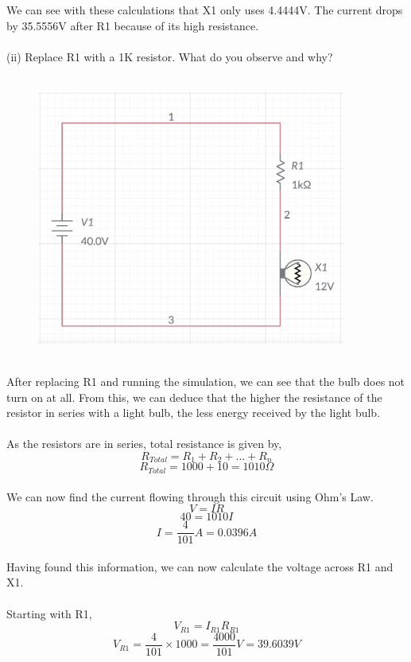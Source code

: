 \documentclass[12pt]{article}
\begin{document}
We can see with these calculations that X1 only uses 4.4444V. The current drops by 35.5556V after R1 because of its high resistance.\\
\\
(ii) Replace R1 with a 1K resistor. What do you observe and why?\\
\\
\begin{figure}[!h] 
	\begin{centering}
		\includegraphics[keepaspectratio = true, width = 4in]{Q2(ii).png}
	\end{centering}
\end{figure}\\
After replacing R1 and running the simulation, we can see that the bulb does not turn on at all. From this, we can deduce that the higher the resistance of the resistor in series with a light bulb, the less energy received by the light bulb.\\
\\
As the resistors are in series, total resistance is given by,\\
\[R_{Total} = R_1 + R_2 + ... + R_n\]
\[R_{Total} = 1000 + 10 = 1010\Omega\]\\
We can now find the current flowing through this circuit using Ohm's Law.\\
\[V = IR\]
\[40 = 1010I\]
\[I = \frac{4}{101}A = 0.0396A\]\\
Having found this information, we can now calculate the voltage across R1 and X1.\\
\\
Starting with R1,\\
\[V_{R1} = I_{R1}R_{R1}\]
\[V_{R1} = \frac{4}{101} \times 1000 = \frac{4000}{101}V = 39.6039V\]\\
\end{document}
